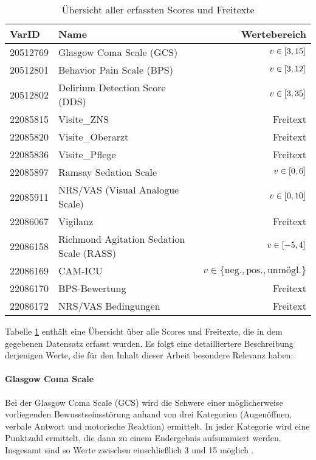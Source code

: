 \begin{table}[h] %
    \centering
    \begin{tabular}{llr}\toprule
        \textbf{VarID}	&\textbf{Name} &\textbf{Wertebereich} \\\midrule
        20512769    & Glasgow Coma Scale (GCS)          & $v \in \interval{3}{15}$ \\
        20512801    & Behavior Pain Scale (BPS)         & $v \in \interval{3}{12}$ \\
        20512802    & Delirium Detection Score (DDS)    & $v \in \interval{3}{35}$ \\
        22085815    & Visite\_ZNS                        & Freitext \\
        22085820    & Visite\_Oberarzt                   & Freitext \\
        22085836    & Visite\_Pflege                     & Freitext \\
        22085897    & Ramsay Sedation Scale             & $v \in \interval{0}{6}$ \\
        22085911    & NRS/VAS (Visual Analogue Scale)   & $v \in \interval{0}{10}$ \\
        22086067    & Vigilanz                          & Freitext \\
        22086158    & Richmond Agitation Sedation Scale (RASS) & $v \in \interval{-5}{4}$ \\
        22086169    & CAM-ICU                           & $v \in \{	\text{neg.}, \text{pos.}, \text{unmögl.} \}$ \\
        22086170    & BPS-Bewertung                     & Freitext \\
        22086172    & NRS/VAS Bedingungen               & Freitext \\\bottomrule
    \end{tabular}

    \caption{Übersicht aller erfassten Scores und Freitexte}
    \label{table:varids}
\end{table}

Tabelle \ref{table:varids} enthält eine Übersicht über alle Scores und Freitexte, die in dem gegebenen Datensatz erfasst wurden. Es folgt eine detailliertere Beschreibung derjenigen Werte, die für den Inhalt dieser Arbeit besondere Relevanz haben:

\paragraph{Glasgow Coma Scale}
Bei der Glasgow Coma Scale (GCS) wird die Schwere einer möglicherweise vorliegenden Bewusstseinsstörung anhand von drei Kategorien (Augenöffnen, verbale Antwort und motorische Reaktion) ermittelt. In jeder Kategorie wird eine Punktzahl ermittelt, die dann zu einem Endergebnis aufsummiert werden. Insgesamt sind so Werte zwischen einschließlich 3 und 15 möglich \citep{teasdaleAssessmentComaImpaired1974,marxIntensivmedizin2015c}.

